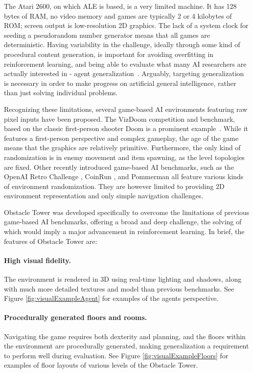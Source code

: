 \documentclass{article}
\begin{document}
The Atari 2600, on which ALE is based, is a very limited machine. It has 128 bytes of RAM, no video memory and games are typically 2 or 4 kilobytes of ROM; screen output is low-resolution 2D graphics. The lack of a system clock for seeding a pseudorandom number generator means that all games are deterministic. Having variability in the challenge, ideally through some kind of procedural content generation, is important for avoiding overfitting in reinforcement learning, and being able to evaluate what many AI researchers are actually interested in -  agent generalization~\cite{cobbe2018quantifying,zhang2018study,justesen2018illuminating}. Arguably, targeting generalization is necessary in order to make progress on artificial general intelligence, rather than just solving individual problems.

Recognizing these limitations, several game-based AI environments featuring raw pixel inputs have been proposed. The VizDoom competition and benchmark, based on the classic first-person shooter Doom is a prominent example~\cite{kempka2016vizdoom}. While it features a first-person perspective and complex gameplay, the age of the game means that the graphics are relatively primitive. Furthermore, the only kind of randomization is in enemy movement and item spawning, as the level topologies are fixed. Other recently introduced game-based AI benchmarks, such as the OpenAI Retro Challenge \cite{nichol2018gotta}, CoinRun \cite{cobbe2018quantifying}, and Pommerman \cite{resnick2018pommerman} all feature various kinds of environment randomization. They are however limited to providing 2D environment representation and only simple navigation challenges.

Obstacle Tower was developed specifically to overcome the limitations of previous game-based AI benchmarks, offering a broad and deep challenge, the solving of which would imply a major advancement in reinforcement learning. In brief, the features of Obstacle Tower are: 

\paragraph{High visual fidelity.} The environment is rendered in 3D using real-time lighting and shadows, along with much more detailed textures and model than previous benchmarks. See Figure \ref{fig:visualExampleAgent} for examples of the agents perspective.
\paragraph{Procedurally generated floors and rooms.} Navigating the game requires both dexterity and planning, and the floors within the environment are procedurally generated, making generalization a requirement to perform well during evaluation. See Figure \ref{fig:visualExampleFloors} for examples of floor layouts of various levels of the Obstacle Tower.
\end{document}
